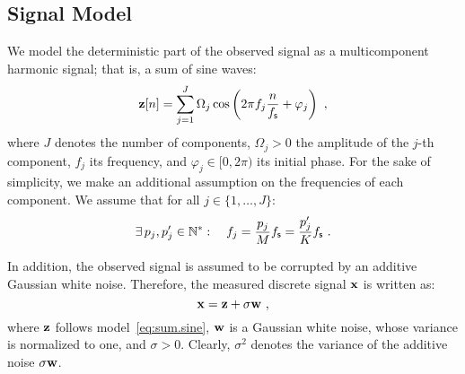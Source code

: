 \subsection{Signal Model}
We model the deterministic part of the observed signal as a multicomponent harmonic signal; that is, a sum of sine waves:
\begin{equation}
\bz[n]=\sum_{j=1}^J\Omega_j\cos\left(2\pi f_j \frac{n}{\fs} + \varphi_j\right)\ ,
\label{eq:sum.sine}
\end{equation}
where $J$ denotes the number of components, $\Omega_j>0$ the amplitude of the $j$-th component, $f_j$ its frequency, and $\varphi_j\in[0,2\pi)$ its initial phase.
%
For the sake of simplicity, we make an additional assumption on the frequencies of each component. We assume that for all $j\in\{1,\dots,J\}$:
\begin{equation}
\exists\, p_j,p_j'\in\mathbb N^*: \quad f_j = \dfrac{p_j}{M}f_{\mathsf s} = \dfrac{p'_j}{K}f_{\mathsf s}\ .
\end{equation}


In addition, the observed signal is assumed to be corrupted by an additive Gaussian white noise. Therefore, the measured discrete signal ${\mathbf x}$ is written as:
\begin{equation}
\bx = \bz + \sigma\bw\ ,
\label{eq:model.noise}
\end{equation}
where ${\mathbf z}$ follows model~\eqref{eq:sum.sine}, ${\mathbf w}$ is a Gaussian white noise, whose variance is normalized to one, and $\sigma>0$. Clearly, $\sigma^2$ denotes the variance of the additive noise $\sigma{\mathbf w}$.


